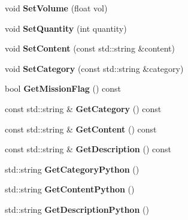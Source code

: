 \begin{DoxyCompactItemize}
\item 
void {\bfseries Set\+Volume} (float vol)\hypertarget{classCargo_ae2879c748d9695d4417cb0adb195d08a}{}\label{classCargo_ae2879c748d9695d4417cb0adb195d08a}

\item 
void {\bfseries Set\+Quantity} (int quantity)\hypertarget{classCargo_ad6fae4fa33422b91d78e0f938e502868}{}\label{classCargo_ad6fae4fa33422b91d78e0f938e502868}

\item 
void {\bfseries Set\+Content} (const std\+::string \&content)\hypertarget{classCargo_aed73830ab9a07cdd7d4055e7e1687941}{}\label{classCargo_aed73830ab9a07cdd7d4055e7e1687941}

\item 
void {\bfseries Set\+Category} (const std\+::string \&category)\hypertarget{classCargo_a045dda6255e371d2e07b69a8025e4d1c}{}\label{classCargo_a045dda6255e371d2e07b69a8025e4d1c}

\item 
bool {\bfseries Get\+Mission\+Flag} () const \hypertarget{classCargo_a2a718f4540c38a9b479829661111a974}{}\label{classCargo_a2a718f4540c38a9b479829661111a974}

\item 
const std\+::string \& {\bfseries Get\+Category} () const \hypertarget{classCargo_a29f725eb6b2669c186b8c390f29822b0}{}\label{classCargo_a29f725eb6b2669c186b8c390f29822b0}

\item 
const std\+::string \& {\bfseries Get\+Content} () const \hypertarget{classCargo_a3478f65bfc93711bc9d72ecf049bdb5d}{}\label{classCargo_a3478f65bfc93711bc9d72ecf049bdb5d}

\item 
const std\+::string \& {\bfseries Get\+Description} () const \hypertarget{classCargo_a77ae29562f2097e685ffc4adfbdd5ffb}{}\label{classCargo_a77ae29562f2097e685ffc4adfbdd5ffb}

\item 
std\+::string {\bfseries Get\+Category\+Python} ()\hypertarget{classCargo_abf083809b618b514cd768dd10281b34e}{}\label{classCargo_abf083809b618b514cd768dd10281b34e}

\item 
std\+::string {\bfseries Get\+Content\+Python} ()\hypertarget{classCargo_a881e729a1f676f9106eb8668232260cf}{}\label{classCargo_a881e729a1f676f9106eb8668232260cf}

\item 
std\+::string {\bfseries Get\+Description\+Python} ()\hypertarget{classCargo_abc47b630b497ecad62342ade8e457b40}{}\label{classCargo_abc47b630b497ecad62342ade8e457b40}


\end{DoxyCompactItemize}
